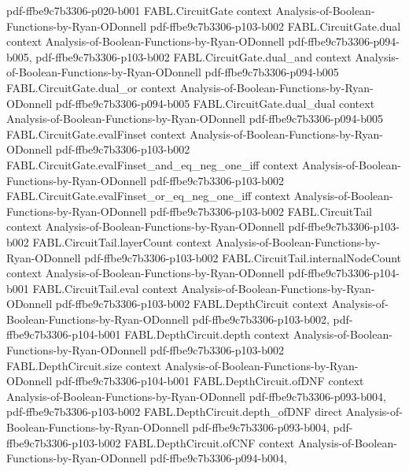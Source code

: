\begin{theorem}
  {pdf-ffbe9c7b3306-p020-b001}
\proofstep
  {FABL.CircuitGate}
  {context}
  {Analysis-of-Boolean-Functions-by-Ryan-ODonnell}
  {pdf-ffbe9c7b3306-p103-b002}
\proofstep
  {FABL.CircuitGate.dual}
  {context}
  {Analysis-of-Boolean-Functions-by-Ryan-ODonnell}
  {pdf-ffbe9c7b3306-p094-b005,
    pdf-ffbe9c7b3306-p103-b002}
\proofstep
  {FABL.CircuitGate.dual_and}
  {context}
  {Analysis-of-Boolean-Functions-by-Ryan-ODonnell}
  {pdf-ffbe9c7b3306-p094-b005}
\proofstep
  {FABL.CircuitGate.dual_or}
  {context}
  {Analysis-of-Boolean-Functions-by-Ryan-ODonnell}
  {pdf-ffbe9c7b3306-p094-b005}
\proofstep
  {FABL.CircuitGate.dual_dual}
  {context}
  {Analysis-of-Boolean-Functions-by-Ryan-ODonnell}
  {pdf-ffbe9c7b3306-p094-b005}
\proofstep
  {FABL.CircuitGate.evalFinset}
  {context}
  {Analysis-of-Boolean-Functions-by-Ryan-ODonnell}
  {pdf-ffbe9c7b3306-p103-b002}
\proofstep
  {FABL.CircuitGate.evalFinset_and_eq_neg_one_iff}
  {context}
  {Analysis-of-Boolean-Functions-by-Ryan-ODonnell}
  {pdf-ffbe9c7b3306-p103-b002}
\proofstep
  {FABL.CircuitGate.evalFinset_or_eq_neg_one_iff}
  {context}
  {Analysis-of-Boolean-Functions-by-Ryan-ODonnell}
  {pdf-ffbe9c7b3306-p103-b002}
\proofstep
  {FABL.CircuitTail}
  {context}
  {Analysis-of-Boolean-Functions-by-Ryan-ODonnell}
  {pdf-ffbe9c7b3306-p103-b002}
\proofstep
  {FABL.CircuitTail.layerCount}
  {context}
  {Analysis-of-Boolean-Functions-by-Ryan-ODonnell}
  {pdf-ffbe9c7b3306-p103-b002}
\proofstep
  {FABL.CircuitTail.internalNodeCount}
  {context}
  {Analysis-of-Boolean-Functions-by-Ryan-ODonnell}
  {pdf-ffbe9c7b3306-p104-b001}
\proofstep
  {FABL.CircuitTail.eval}
  {context}
  {Analysis-of-Boolean-Functions-by-Ryan-ODonnell}
  {pdf-ffbe9c7b3306-p103-b002}
\proofstep
  {FABL.DepthCircuit}
  {context}
  {Analysis-of-Boolean-Functions-by-Ryan-ODonnell}
  {pdf-ffbe9c7b3306-p103-b002,
    pdf-ffbe9c7b3306-p104-b001}
\proofstep
  {FABL.DepthCircuit.depth}
  {context}
  {Analysis-of-Boolean-Functions-by-Ryan-ODonnell}
  {pdf-ffbe9c7b3306-p103-b002}
\proofstep
  {FABL.DepthCircuit.size}
  {context}
  {Analysis-of-Boolean-Functions-by-Ryan-ODonnell}
  {pdf-ffbe9c7b3306-p104-b001}
\proofstep
  {FABL.DepthCircuit.ofDNF}
  {context}
  {Analysis-of-Boolean-Functions-by-Ryan-ODonnell}
  {pdf-ffbe9c7b3306-p093-b004,
    pdf-ffbe9c7b3306-p103-b002}
\proofstep
  {FABL.DepthCircuit.depth_ofDNF}
  {direct}
  {Analysis-of-Boolean-Functions-by-Ryan-ODonnell}
  {pdf-ffbe9c7b3306-p093-b004,
    pdf-ffbe9c7b3306-p103-b002}
\proofstep
  {FABL.DepthCircuit.ofCNF}
  {context}
  {Analysis-of-Boolean-Functions-by-Ryan-ODonnell}
  {pdf-ffbe9c7b3306-p094-b004,
}
\end{theorem}
